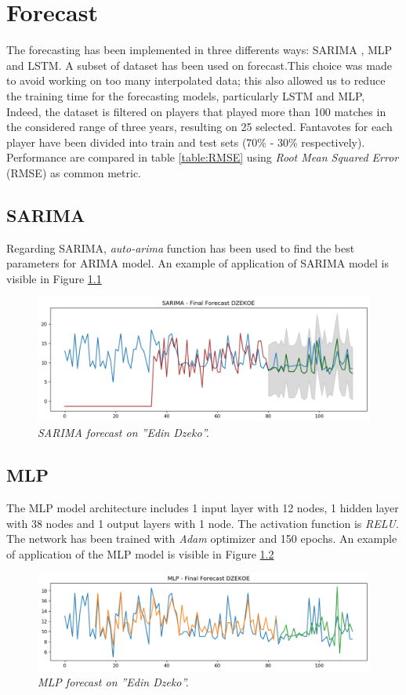 \chapter {Forecast}

The forecasting has been implemented in three differents ways: SARIMA , MLP and LSTM.
A subset of dataset has been used on forecast.This choice was made to avoid working on too many interpolated data; this also allowed us to reduce the training time for the forecasting models, particularly LSTM and MLP,
Indeed, the dataset is filtered on players that played more than 100 matches in the considered range of three years, resulting on 25 selected.
Fantavotes for each player have been divided into train and test sets (70\% - 30\% respectively).
Performance are compared in table \ref{table:RMSE} using \textit{Root Mean Squared Error} (RMSE) as common metric.

\section{SARIMA}

Regarding SARIMA, \textit{auto-arima} function has been used to find the best parameters for ARIMA model.
An example of application of SARIMA model is visible in Figure \ref{fig:sarima}

\begin{figure}[H]
  \includegraphics[scale=0.5]{images/dzeko_sarima_fantavoti.png}
   \centering  
   \caption{\textit{SARIMA forecast on ''Edin Dzeko''.}}
  \label{fig:sarima}
\end{figure}

\section{MLP}
The MLP model architecture includes 1 input layer with 12 nodes, 1 hidden layer with 38 nodes and 1 output layers with 1 node. The activation function is \textit{RELU}.
The network has been trained with \textit{Adam} optimizer and 150 epochs.
An example of application of the MLP model is visible in Figure \ref{fig:mlp}
\begin{figure}[H]
  \includegraphics[scale=0.5]{images/dzeko_mlp_fantavoti.png}
   \centering  
   \caption{\textit{MLP forecast on ''Edin Dzeko''.}}
  \label{fig:mlp}
\end{figure}

